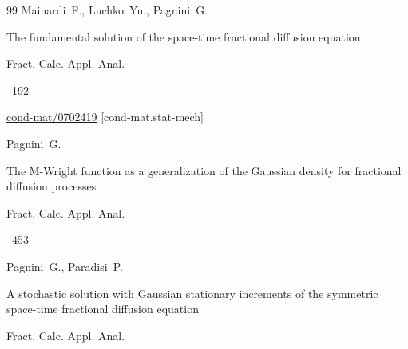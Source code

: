 \begin{thebibliography}{99}
\by Mainardi~F., Luchko~Yu., Pagnini~G.

\paper The fundamental solution of the space-time fractional diffusion equation

\jour Fract. Calc. Appl. Anal.




--192

\arxiv \href{https://arxiv.org/abs/cond-mat/0702419}{cond-mat/0702419} [cond-mat.stat-mech]







\by Pagnini~G.

\paper The M-Wright function as a generalization of the Gaussian density for fractional diffusion processes

\jour Fract. Calc. Appl. Anal.




--453











\by Pagnini~G., Paradisi~P.

\paper A stochastic solution with Gaussian stationary increments of the symmetric space-time fractional diffusion equation

\jour Fract. Calc. Appl. Anal.





\end{thebibliography}
